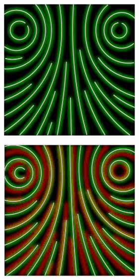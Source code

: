 \begin{figure}[ht]
    \centering
    \begin{subfigure}{\textwidth}
        \begin{subfigure}{.19\textwidth}
            \centering
            \includegraphics[scale=.055]{figures/AlphaStudy/GyroNC.0000.png}
        \end{subfigure}
        \begin{subfigure}{.19\textwidth}
            \centering
            \includegraphics[scale=.0535]{figures/AlphaStudy/GyroNC.0001.png}

\end{subfigure}
\end{subfigure}
\end{figure}
